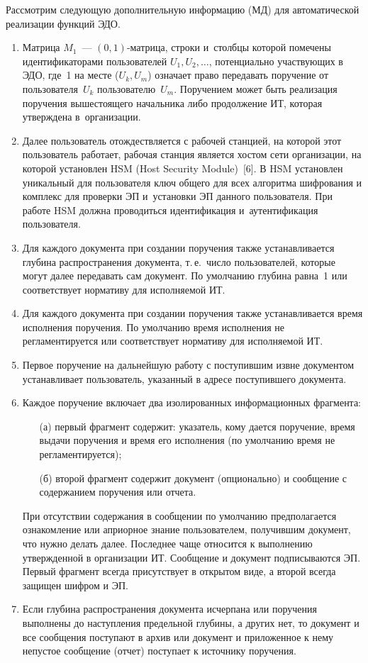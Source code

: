 \begin{multicols}{2}
  Рассмотрим следующую дополнительную информацию (МД) для 
автоматической реализации функций ЭДО.
  \begin{enumerate}[1.]
\item  Матрица $M_1$~--- $(0, 1)$-мат\-ри\-ца, строки и~столб\-цы которой 
помечены идентификаторами пользователей $U_1, U_2,\ldots$, потенциально 
участвующих в ЭДО, где~1 на месте ($U_k, U_m$) означает право 
передавать поручение от пользователя~$U_k$ пользователю~$U_m$. Поручением 
может быть реализация поручения вышестоящего начальника либо продолжение 
ИТ, которая утверждена в~организации.
  \item Далее пользователь отождествляется с рабочей станцией, на которой этот 
пользователь работает, рабочая станция является хостом сети организации, на 
которой установлен HSM (Host Security Module)~[6]. В HSM установлен 
уникальный для пользователя ключ общего для всех алгоритма шифрования и 
комплекс для проверки ЭП и~установки ЭП данного 
пользователя. При работе HSM должна проводиться идентификация 
и~аутентификация пользователя.
  \item Для каждого документа при создании поручения также устанавливается 
глубина распространения документа, т.\,е.\ число пользователей, которые могут 
далее передавать сам документ. По умолчанию глубина равна~1 или соответствует 
нормативу для исполняемой ИТ.
  \item Для каждого документа при создании поручения также устанавливается 
время исполнения поручения. По умолчанию время исполнения не 
регламентируется или соответствует нормативу для исполняемой ИТ.
  \item Первое поручение на дальнейшую работу с поступившим извне 
документом устанавливает пользователь, указанный в адресе поступившего 
документа.
  \item  Каждое поручение включает два изолированных информационных 
фрагмента: 
  \begin{itemize}
\item[(а)] первый фрагмент содержит: указатель, кому дается поручение, время 
выдачи поручения и время его исполнения (по умолчанию время не 
регламентируется); 
\item[(б)] второй фрагмент содержит документ (опционально) и сообщение с 
содержанием поручения или отчета. 
\end{itemize}
  При отсутствии содержания в сообщении по умолчанию предполагается 
ознакомление или априорное знание пользователем, получившим документ, что 
нужно делать далее. Последнее чаще относится к выполнению утвержденной в 
организации ИТ. Сообщение и документ подписываются ЭП. Первый фрагмент 
всегда присутствует в открытом виде, а второй всегда защищен шифром и ЭП.
  \item Если глубина распространения документа исчерпана или поручения 
выполнены до наступления предельной глубины, а других нет, то документ и все 
сообщения поступают в архив или документ и приложенное к нему непустое 
сообщение (отчет) поступает к источнику поручения.
  \end{enumerate}
  

\end{multicols}
